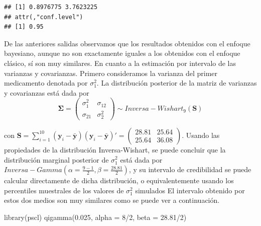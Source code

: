 \documentclass[
  10pt,
  spanish,
]{book}
\newenvironment{Shaded}{\begin{snugshade}}{\end{snugshade}}
\newcommand{\AttributeTok}[1]{\textcolor[rgb]{0.77,0.63,0.00}{#1}}
\newcommand{\DecValTok}[1]{\textcolor[rgb]{0.00,0.00,0.81}{#1}}
\newcommand{\FloatTok}[1]{\textcolor[rgb]{0.00,0.00,0.81}{#1}}
\newcommand{\FunctionTok}[1]{\textcolor[rgb]{0.00,0.00,0.00}{#1}}
\newcommand{\NormalTok}[1]{#1}
\newcommand{\SpecialCharTok}[1]{\textcolor[rgb]{0.00,0.00,0.00}{#1}}
\theoremstyle{definition}
\theoremstyle{definition}
\theoremstyle{definition}
\theoremstyle{definition}
\theoremstyle{remark}
\begin{document}
\begin{Shaded}
\end{Shaded}

\begin{verbatim}
## [1] 0.8976775 3.7623225
## attr(,"conf.level")
## [1] 0.95
\end{verbatim}

De las anteriores salidas observamos que los resultados obtenidos con el enfoque bayesiano, aunque no son exactamente iguales a los obtenidos con el enfoque clásico, sí son muy similares. En cuanto a la estimación por intervalo de las varianzas y covarianzas. Primero consideramos la varianza del primer medicamento denotada por \(\sigma^2_1\). La distribución posterior de la matriz de varianzas y covarianzas está dada por
\begin{equation*}
\boldsymbol \Sigma=\begin{pmatrix}\sigma^2_1&\sigma_{12}\\\sigma_{21}&\sigma^2_{2} \end{pmatrix}\sim Inversa-Wishart_9(\mathbf{S})
\end{equation*}

con \(\mathbf{S}=\sum_{i=1}^{10}(\mathbf{y}_i-\bar{\mathbf{y}})(\mathbf{y}_i-\bar{\mathbf{y}})'=\begin{pmatrix}28.81&25.64\\25.64&36.08\end{pmatrix}\). Usando las propiedades de la distribución Inversa-Wishart, se puede concluir que la distribución marginal posterior de \(\sigma^2_1\) está dada por \(Inversa-Gamma(\alpha=\frac{9-1}{2}, \beta=\frac{28.81}{2})\), y su intervalo de credibilidad se puede calcular directamente de dicha distribución, o equivalentemente usando los percentiles muestrales de los valores de \(\sigma^2_1\) simulados El intervalo obtenido por estos dos medios son muy similares como se puede ver a continuación.

\begin{Shaded}
\begin{Highlighting}[]
\FunctionTok{library}\NormalTok{(pscl)}
\FunctionTok{qigamma}\NormalTok{(}\FloatTok{0.025}\NormalTok{, }\AttributeTok{alpha =} \DecValTok{8}\SpecialCharTok{/}\DecValTok{2}\NormalTok{, }\AttributeTok{beta =} \FloatTok{28.81}\SpecialCharTok{/}\DecValTok{2}\NormalTok{)}
\end{Highlighting}
\end{Shaded}
\end{document}
